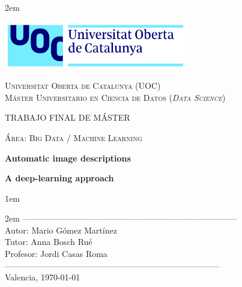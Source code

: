 \newpage
\thispagestyle{empty}

\baselineskip 2em


\centerline{\includegraphics[width=0.6\textwidth]{images/UOC-logo}}
\begin{center}
\textsc{Universitat Oberta de Catalunya (UOC) \\
 Máster Universitario en Ciencia de Datos (\textit{Data Science})\\}


\vspace*{1.5cm}

\textsc{\Large TRABAJO FINAL DE MÁSTER}

\vspace*{0.5cm}

\textsc{\large Área: Big Data / Machine Learning}



\vspace*{2.0cm}

\textbf{\Large Automatic image descriptions}

\textbf{\large A deep-learning approach}

\vspace{2.5cm}
\baselineskip 1em

\baselineskip 2em
-----------------------------------------------------------------------------\\
Autor:      Mario Gómez Martínez\\
Tutor:      Anna Bosch Rué\\
Profesor:   Jordi Casas Roma\\
-----------------------------------------------------------------------------\\
\vspace*{1.5cm}
Valencia, \today

\end{center}

\newpage
\pagestyle{empty}
\hfill

